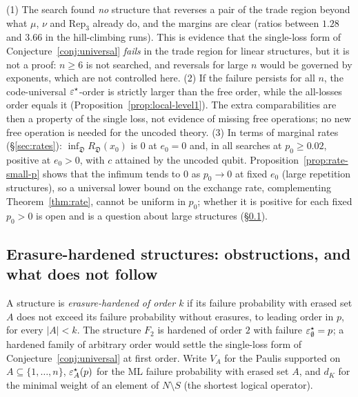 \begin{remark}\label{rem:search}
(1) The search found \emph{no} structure that reverses a pair of the trade region beyond what $\mu$, $\nu$ and $\mathrm{Rep}_3$ already do, and the margins are clear (ratios between $1.28$ and $3.66$ in the hill-climbing runs). This is evidence that the single-loss form of Conjecture~\ref{conj:universal} \emph{fails} in the trade region for linear structures, but it is not a proof: $n\ge6$ is not searched, and reversals for large $n$ would be governed by exponents, which are not controlled here.
(2) If the failure persists for all $n$, the code-universal $\varepsilon^{\star}$-order is strictly larger than the free order, while the all-losses order equals it (Proposition~\ref{prop:local-level1}). The extra comparabilities are then a property of the single loss, not evidence of missing free operations; no new free operation is needed for the uncoded theory.
(3) In terms of marginal rates (\S\ref{sec:rates}): $\inf_{\mathfrak D}R_{\mathfrak D}(x_0)$ is $0$ at $e_0=0$ and, in all searches at $p_0\ge0.02$, positive at $e_0>0$, with $c$ attained by the uncoded qubit. Proposition~\ref{prop:rate-small-p} shows that the infimum tends to $0$ as $p_0\to0$ at fixed $e_0$ (large repetition structures), so a universal lower bound on the exchange rate, complementing Theorem~\ref{thm:rate}, cannot be uniform in $p_0$; whether it is positive for each fixed $p_0>0$ is open and is a question about large structures (\S\ref{sec:hardened}).
\end{remark}

\subsection{Erasure-hardened structures: obstructions, and what does not follow}\label{sec:hardened}

A structure is \emph{erasure-hardened of order $k$} if its failure probability with erased set $A$ does not exceed its failure probability without erasures, to leading order in $p$, for every $|A|<k$.
The structure $F_2$ is hardened of order $2$ with failure $\varepsilon^{\star}_\emptyset=p$; a hardened family of arbitrary order would settle the single-loss form of Conjecture~\ref{conj:universal} at first order.
Write $V_A$ for the Paulis supported on $A\subseteq\{1,\dots,n\}$, $\varepsilon^{\star}_A(p)$ for the ML failure probability with erased set $A$, and $d_K$ for the minimal weight of an element of $N\setminus S$ (the shortest logical operator).

